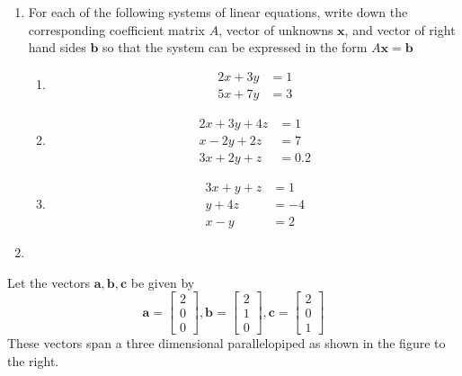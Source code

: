 \documentclass[11pt,a4paper,titlepage,oneside,openany]{article}
\numberwithin{equation}{section}
\numberwithin{algorithm}{section}
\numberwithin{figure}{section}
\numberwithin{table}{section}
\renewcommand{\vec}[1]{\mathbf{#1}}
\begin{document}
\begin{enumerate}
\item
  For each of the following systems of linear equations, write down the corresponding coefficient matrix $A$, vector of unknowns $\vec{x}$, and vector of right hand sides $\vec{b}$ so that the system can be expressed in the form $A\vec{x}=\vec{b}$
  \begin{multicols}{3}
    \begin{enumerate}
      \item
        \begin{align*}
          2x+3y&=1\\
          5x+7y&=3
        \end{align*}
      \item\begin{align*}
          2x+3y+4z&=1\\
          x-2y+2z&=7\\
          3x+2y+z&=0.2
        \end{align*}
        \item
        \begin{align*}
          3x+y+z&=1\\
          y+4z&=-4\\
          x-y&=2
        \end{align*}
    \end{enumerate}
  \end{multicols}
\item
\end{enumerate}

Let the vectors $\vec{a},\vec{b},\vec{c}$ be given by
  \begin{equation*}
    \vec{a}=\left[ \begin{array}{c} 2 \\ 0 \\ 0 \end{array}\right],
    \vec{b}=\left[ \begin{array}{c} 2 \\ 1 \\ 0 \end{array}\right],
    \vec{c}=\left[ \begin{array}{c} 2 \\ 0 \\ 1 \end{array}\right]
  \end{equation*}
  These vectors span a three dimensional parallelopiped as shown in the figure to the right.
\end{document}
